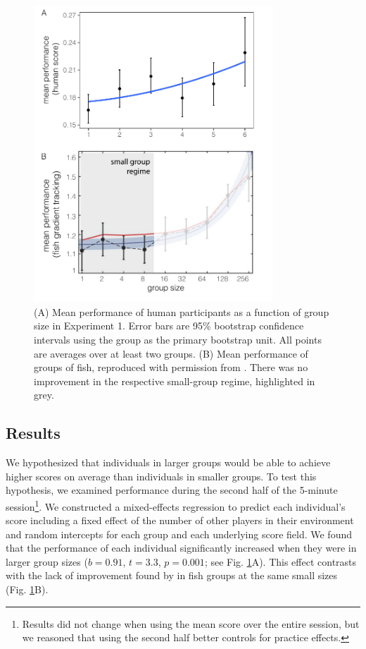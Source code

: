 \documentclass[12pt,letterpaper]{article}
\begin{document}
\begin{figure}[t!]
  \centering
  \includegraphics[width=0.8\textwidth]{./figures/exp1_combined.pdf}
  \caption{(A) Mean performance of human participants as a function of group size in Experiment 1.  Error bars are 95\% bootstrap confidence intervals using the group as the primary bootstrap unit.  All points are averages over at least two groups. (B) Mean performance of groups of fish, reproduced with permission from . There was no improvement in the respective small-group regime, highlighted in grey.}
  \label{fig:exp1_performance}
\end{figure}

\subsection{Results}

We hypothesized that individuals in larger groups would be able to achieve higher scores on average than individuals in smaller groups. 
To test this hypothesis, we examined performance during the second half of the 5-minute session\footnote{Results did not change when using the mean score over the entire session, but we reasoned that using the second half better controls for practice effects.}. 
We constructed a mixed-effects regression to predict each individual's score including a fixed effect of the number of other players in their environment and random intercepts for each group and each underlying score field.
We found that the performance of each individual significantly increased when they were in larger group sizes ($b = 0.91$, $t = 3.3$, $p = 0.001$; see Fig. \ref{fig:exp1_performance}A). 
This effect contrasts with the lack of improvement found by  in fish groups at the same small sizes (Fig. \ref{fig:exp1_performance}B).
\end{document}
